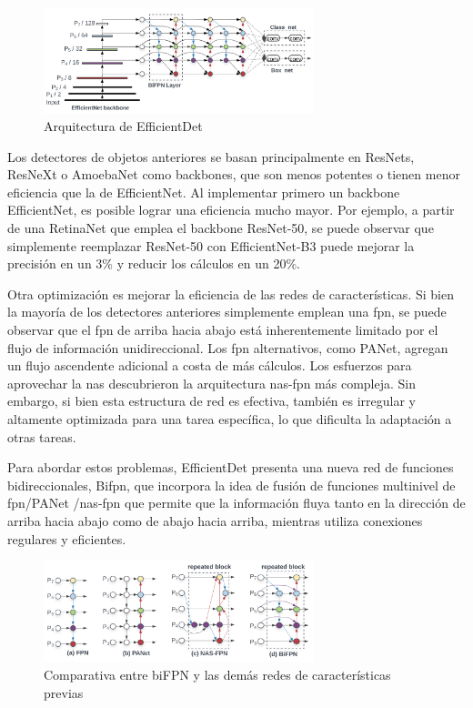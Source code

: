 \begin{figure}[ht]
\centering
\includegraphics[width=0.7\textwidth]{img/chapters/estado-del-arte/arquitectura-efficientdet.png}
\caption{\label{fig:arquitectura-efficientdet}Arquitectura de EfficientDet}
\end{figure}

Los detectores de objetos anteriores se basan principalmente en ResNets, ResNeXt o AmoebaNet como backbones, que son menos potentes o tienen menor eficiencia que la de EfficientNet. Al implementar primero un backbone EfficientNet, es posible lograr una eficiencia mucho mayor. Por ejemplo, a partir de una RetinaNet que emplea el backbone ResNet-50, se puede observar que simplemente reemplazar ResNet-50 con EfficientNet-B3 puede mejorar la precisión en un 3\% y reducir los cálculos en un 20\%.

Otra optimización es mejorar la eficiencia de las redes de características. Si bien la mayoría de los detectores anteriores simplemente emplean una \gls{fpn}, se puede observar que el \gls{fpn} de arriba hacia abajo está inherentemente limitado por el flujo de información unidireccional. Los \gls{fpn} alternativos, como PANet, agregan un flujo ascendente adicional a costa de más cálculos. Los esfuerzos para aprovechar la \gls{nas} descubrieron la arquitectura \gls{nas}-\gls{fpn} más compleja. Sin embargo, si bien esta estructura de red es efectiva, también es irregular y altamente optimizada para una tarea específica, lo que dificulta la adaptación a otras tareas.

Para abordar estos problemas, EfficientDet presenta una nueva red de funciones bidireccionales, Bi\gls{fpn}, que incorpora la idea de fusión de funciones multinivel de \gls{fpn}/PANet /\gls{nas}-\gls{fpn} que permite que la información fluya tanto en la dirección de arriba hacia abajo como de abajo hacia arriba, mientras utiliza conexiones regulares y eficientes.

\begin{figure}[ht]
\centering
\includegraphics[width=0.7\textwidth]{img/chapters/estado-del-arte/comparativa_fpn+panet+nas-fpn+bifpn.png}
\caption{\label{fig:comparativa-bifpn}Comparativa entre biFPN y las demás redes de características previas}
\end{figure}

